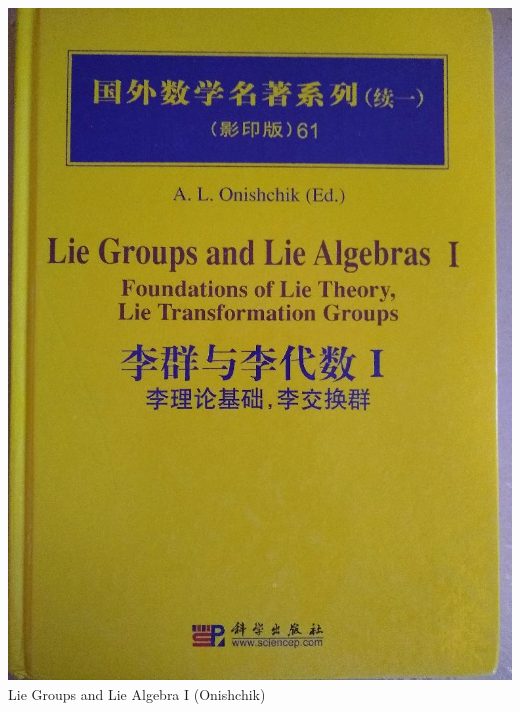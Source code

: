 \documentclass[t]{beamer}
\newcommand{\htarget}[2]{\hypertarget{#1}{#2}}
\begin{document}
\begin{frame}\htarget{LGA1}{} \begin{center}
\includegraphics[height=0.8\textheight]{LieGroups_and_LieAlgebra1_mini.jpg} \\
Lie Groups and Lie Algebra I (Onishchik)
\end{center} \end{frame}
\end{document}
